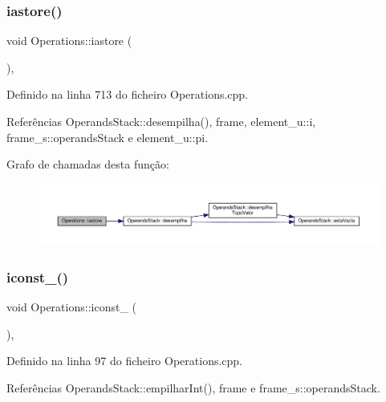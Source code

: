 \subsubsection{\texorpdfstring{iastore()}{iastore()}}
{\footnotesize\ttfamily void Operations\+::iastore (\begin{DoxyParamCaption}{ }\end{DoxyParamCaption})\hspace{0.3cm}{\ttfamily [static]}, {\ttfamily [private]}}



Definido na linha 713 do ficheiro Operations.\+cpp.



Referências Operands\+Stack\+::desempilha(), frame, element\+\_\+u\+::i, frame\+\_\+s\+::operands\+Stack e element\+\_\+u\+::pi.

Grafo de chamadas desta função\+:
\nopagebreak
\begin{figure}[H]
\begin{center}
\leavevmode
\includegraphics[width=350pt]{classOperations_aeec162356a6792b1d0ba385f75f443b1_cgraph}
\end{center}
\end{figure}
\mbox{\label{classOperations_a89879486791daebe6659b96688465c9d}} 
\subsubsection{\texorpdfstring{iconst\+\_()}{iconst\_0()}}
{\footnotesize\ttfamily void Operations\+::iconst\+\_ (\begin{DoxyParamCaption}{ }\end{DoxyParamCaption})\hspace{0.3cm}{\ttfamily [static]}, {\ttfamily [private]}}



Definido na linha 97 do ficheiro Operations.\+cpp.



Referências Operands\+Stack\+::empilhar\+Int(), frame e frame\+\_\+s\+::operands\+Stack.

